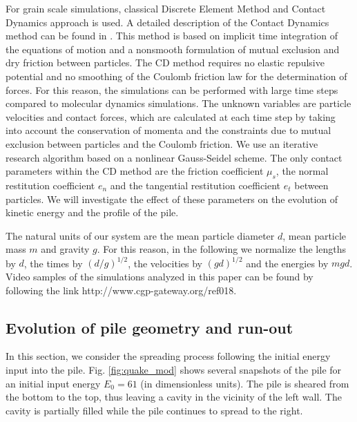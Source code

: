 For grain scale simulations, classical Discrete Element Method and Contact 
Dynamics approach is used. 
A detailed description of the Contact Dynamics 
method can be found in \cite{Moreau1993,Jean1999,Radjai2009,Radjai2011}. 
This method is based on implicit time integration of the equations of motion 
and a nonsmooth formulation of mutual exclusion and dry friction between 
particles. The CD method requires no elastic repulsive potential and no 
smoothing of the Coulomb friction law for the determination of forces. 
For this reason, the simulations can be performed with large time steps 
compared to molecular dynamics simulations. The unknown variables are particle 
velocities and contact forces, which are calculated at each time step by taking 
into account the conservation of momenta and the constraints due to mutual 
exclusion between particles and the Coulomb friction. We use an iterative 
research algorithm based on a nonlinear Gauss-Seidel scheme. The only contact 
parameters within the CD method are the friction coefficient $\mu_s$, the 
normal restitution coefficient $e_n$ and the tangential restitution coefficient 
$e_t$ between particles. We will investigate the effect of these parameters on 
the evolution of kinetic energy and the profile of the pile.     
  
The natural units of our system are the mean particle diameter $d$, 
mean particle mass $m$ and gravity $g$. For this reason, 
in the following we normalize the lengths by $d$, the times by $(d/g)^{1/2}$, 
the velocities by $(gd)^{1/2}$ and the energies by $mgd$.    
Video samples of the simulations analyzed in this paper
can be found by following the link http://www.cgp-gateway.org/ref018.

\subsection{Evolution of pile geometry and run-out}
\label{sec:evolution}

In this section, we consider the spreading process following the initial energy 
input into the pile. Fig. \ref{fig:quake_mod} shows several snapshots of the 
pile for an initial input energy $E_0 = 61$ (in dimensionless units).
The pile is sheared from the bottom to the top, thus leaving a cavity in the 
vicinity of the left wall. The cavity is partially filled while the pile 
continues to spread to the right. 



